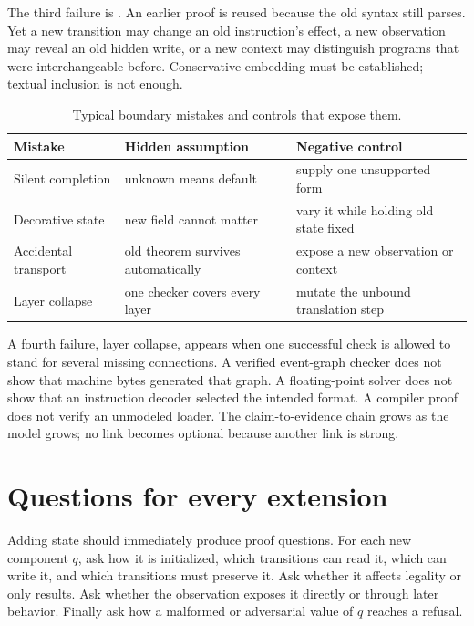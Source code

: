 The third failure is . An earlier proof
is reused because the old syntax still parses. Yet a new transition may change
an old instruction's effect, a new observation may reveal an old hidden write,
or a new context may distinguish programs that were interchangeable before.
Conservative embedding must be established; textual inclusion is not enough.

\begin{table}[htbp]
\centering
\caption{Typical boundary mistakes and controls that expose them.}
\begin{tabular}{@{}p{}p{}p{}@{}}
\toprule
Mistake & Hidden assumption & Negative control \\
\midrule
Silent completion & unknown means default & supply one unsupported form \\
Decorative state & new field cannot matter & vary it while holding old state fixed \\
Accidental transport & old theorem survives automatically & expose a new observation or context \\
Layer collapse & one checker covers every layer & mutate the unbound translation step \\
\bottomrule
\end{tabular}
\end{table}

A fourth failure, layer collapse, appears when one successful check is allowed
to stand for several missing connections. A verified event-graph checker does
not show that machine bytes generated that graph. A floating-point solver does
not show that an instruction decoder selected the intended format. A compiler
proof does not verify an unmodeled loader. The claim-to-evidence chain grows as
the model grows; no link becomes optional because another link is strong.

\section{Questions for every extension}

Adding state should immediately produce proof questions. For each new component
\(q\), ask how it is initialized, which transitions can read it, which can
write it, and which transitions must preserve it. Ask whether it affects
legality or only results. Ask whether the observation exposes it directly or
through later behavior. Finally ask how a malformed or adversarial value of
\(q\) reaches a refusal.

